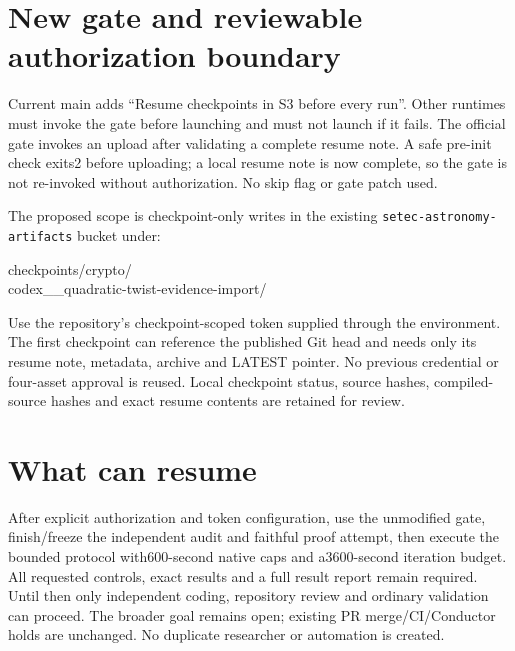 \documentclass[10pt]{article}
\begin{document}
\section*{New gate and reviewable authorization boundary}
Current main adds
``Resume checkpoints in S3 before every run''. Other runtimes must invoke the
gate before launching and must not launch if it fails. The official gate
invokes an upload after validating a complete resume note. A safe pre-init
check exits2 before uploading; a local resume note is now complete, so the
gate is not re-invoked without authorization. No skip flag or gate patch used.

The proposed scope is checkpoint-only writes in the existing
\texttt{setec-astronomy-artifacts} bucket under:
\begin{center}\small\ttfamily checkpoints/crypto/\\
codex\_\_quadratic-twist-evidence-import/\end{center}
Use the repository's
checkpoint-scoped token supplied through the environment. The first checkpoint can reference the published Git head and needs only its resume note, metadata,
archive and LATEST pointer. No previous credential or four-asset approval is
reused. Local checkpoint status, source hashes, compiled-source hashes and
exact resume contents are retained for review.

\section*{What can resume}
After explicit authorization and token configuration, use the unmodified gate,
finish/freeze the independent audit and faithful proof attempt, then execute the
bounded protocol with600-second native caps and a3600-second iteration budget.
All requested controls, exact results and a full result report remain required.
Until then only independent coding, repository review and ordinary validation
can proceed. The broader goal remains open; existing PR merge/CI/Conductor
holds are unchanged. No duplicate researcher or automation is created.
\end{document}

